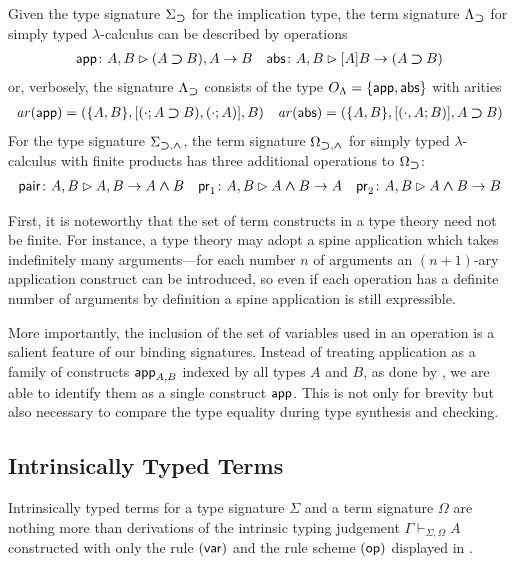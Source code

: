 \documentclass[acmsmall,screen]{acmart}
\theoremstyle{acmdefinition}
\begin{document}
\begin{example} \label{ex:STLC-sig}
  Given the type signature $\Sigma_{\mathbin{\bm{\supset}}}$ for the implication type, the term signature $\Lambda_{\mathbin{\bm{\supset}}}$ for simply typed $\lambda$-calculus can be described by operations
  \begin{align*}
    \mathsf{app}\colon A, B \rhd (A \mathbin{\bm{\supset}} B), A \to B && \mathsf{abs}\colon A , B \rhd [A]B \to (A \mathbin{\bm{\supset}} B)
  \end{align*}
    or, verbosely, the signature $\Lambda_{\mathbin{\bm{\supset}}}$ consists of the type $O_\Lambda = \{\mathsf{app}, \mathsf{abs}\}$ with arities
  \begin{align*}
    \mathit{ar}(\mathsf{app}) = (\{A, B\}, [(\cdot; A \mathbin{\bm{\supset}} B), (\cdot; A)], B)
    && 
    \mathit{ar}(\mathsf{abs}) = (\{A, B\}, [(\cdot, A; B)], A \mathbin{\bm{\supset}} B)
  \end{align*}
  For the type signature $\Sigma_{\mathbin{\bm{\supset}}, \mathbin{\bm{\wedge}}}$, the term signature $\Omega_{\mathbin{\bm{\supset}}, \mathbin{\bm{\wedge}}}$ for simply typed $\lambda$-calculus with finite products has three additional operations
to $\Omega_{\mathbin{\bm{\supset}}}$:
  \begin{align*}
    \mathsf{pair}\colon A, B \rhd A, B \to A \mathbin{\bm{\wedge}} B
    && \mathsf{pr}_{1} \colon A, B \rhd A \mathbin{\bm{\wedge}} B \to A
    && \mathsf{pr}_{2} \colon A, B \rhd A \mathbin{\bm{\wedge}} B \to B
  \end{align*}
\end{example}

First, it is noteworthy that the set of term constructs in a type theory need not be finite.
For instance, a type theory may adopt a spine application which takes indefinitely many arguments---for each number $n$ of arguments an $(n+1)$-ary application construct can be introduced, so even if each operation has a definite number of arguments by definition a spine application is still expressible.

More importantly, the inclusion of the set of variables used in an operation is a salient feature of our binding signatures.
Instead of treating application as a family of constructs $\mathsf{app}_{A, B}$ indexed by all types $A$ and $B$, as done by \citet{Fiore2022}, we are able to identify them as a single construct $\mathsf{app}$.
This is not only for brevity but also necessary to compare the type equality during type synthesis and checking.

\subsection{Intrinsically Typed Terms}

Intrinsically typed terms for a type signature $\Sigma$ and a term signature $\Omega$ are nothing more than derivations of the intrinsic typing judgement $\Gamma \vdash_{\Sigma, \Omega} A$ constructed with only the rule $(\mathsf{var})$ and the rule scheme $(\mathsf{op})$ displayed in .
\end{document}
